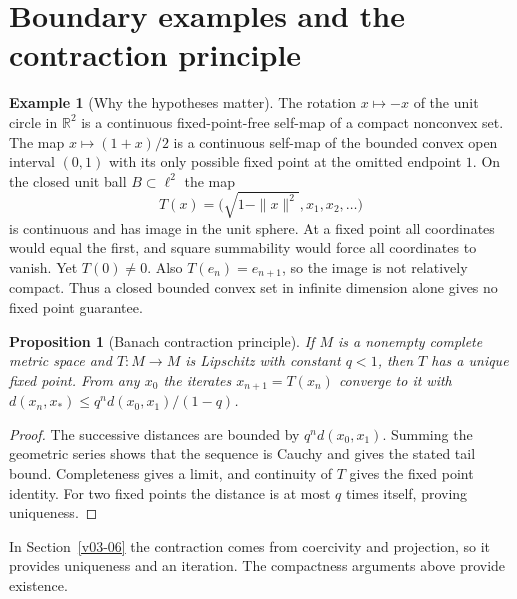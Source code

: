 \documentclass[11pt,oneside,openany]{book}
\theoremstyle{plain}
\newtheorem{proposition}[theorem]{Proposition}
\theoremstyle{definition}
\newtheorem{example}[theorem]{Example}
\theoremstyle{remark}
\begin{document}
\section{Boundary examples and the contraction principle}
\label{v10-04}

\begin{example}[Why the hypotheses matter]
The rotation \(x\mapsto-x\) of the unit circle in \(\mathbb R^2\)
is a continuous fixed-point-free self-map of a compact nonconvex
set. The map \(x\mapsto (1+x)/2\) is a continuous self-map of the
bounded convex open interval \((0,1)\) with its only possible
fixed point at the omitted endpoint \(1\).
On the closed unit ball \(B\subset\ell^2\) the map
\[
 T(x)=\bigl(\sqrt{1-\|x\|^2},x_1,x_2,\ldots\bigr)
\]
is continuous and has image in the unit sphere. At a fixed
point all coordinates would equal the first, and square
summability would force all coordinates to vanish. Yet
\(T(0)\ne0\). Also \(T(e_n)=e_{n+1}\), so the image is not
relatively compact. Thus a closed bounded convex set in
infinite dimension alone gives no fixed point guarantee.
\end{example}

\begin{proposition}[Banach contraction principle]
\label{prop:v10-04-01}
If \(M\) is a nonempty complete metric space and
\(T:M\to M\) is Lipschitz with constant \(q<1\), then
\(T\) has a unique fixed point. From any \(x_0\) the iterates
\(x_{n+1}=T(x_n)\) converge to it with
\(d(x_n,x_*)\le q^n d(x_0,x_1)/(1-q)\).
\end{proposition}
\begin{proof}
The successive distances are bounded by
\(q^n d(x_0,x_1)\). Summing the geometric series shows that
the sequence is Cauchy and gives the stated tail bound.
Completeness gives a limit, and continuity of \(T\) gives
the fixed point identity. For two fixed points the
distance is at most \(q\) times itself, proving uniqueness.
\end{proof}

In Section~\ref{v03-06} the contraction comes from coercivity
and projection, so it provides uniqueness and an iteration.
The compactness arguments above provide existence.
\end{document}

